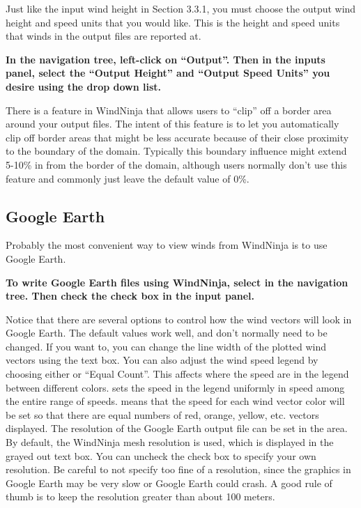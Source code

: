 \documentclass[12pt]{article}
\begin{document}
Just like the input wind height in Section 3.3.1, you must choose the output wind height and speed units that you would like.  This is the height and speed units that winds in the output files are reported at.

\textbf{\color{red} In the navigation tree, left-click on “Output”.  Then in the inputs panel, select the “Output Height” and “Output Speed Units” you desire using the drop down list.}

There is a feature in WindNinja that allows users to “clip” off a border area around your output files.  The intent of this feature is to let you automatically clip off border areas that might be less accurate because of their close proximity to the boundary of the domain.  Typically this boundary influence might extend 5-10\% in from the border of the domain, although users normally don't use this feature and commonly just leave the default value of 0\%.

\subsection{Google Earth}

Probably the most convenient way to view winds from WindNinja is to use Google Earth.

\textbf{\color{red} To write Google Earth files using WindNinja, select  in the navigation tree.  Then check the  check box in the input panel.}

Notice that there are several options to control how the wind vectors will look in Google Earth.  The default values work well, and don't normally need to be changed.  If you want to, you can change the line width of the plotted wind vectors using the  text box.  You can also adjust the wind speed legend by choosing either  or “Equal Count”.  This affects where the speed  are in the legend between different colors.   sets the speed  in the legend uniformly in speed among the entire range of speeds.   means that the speed  for each wind vector color will be set so that there are equal numbers of red, orange, yellow, etc. vectors displayed.  The resolution of the Google Earth output file can be set in the  area.  By default, the WindNinja mesh resolution is used, which is displayed in the grayed out text box.  You can uncheck the  check box to specify your own resolution.  Be careful to not specify too fine of a resolution, since the graphics in Google Earth may be very slow or Google Earth could crash.  A good rule of thumb is to keep the resolution greater than about 100 meters.
\end{document}
